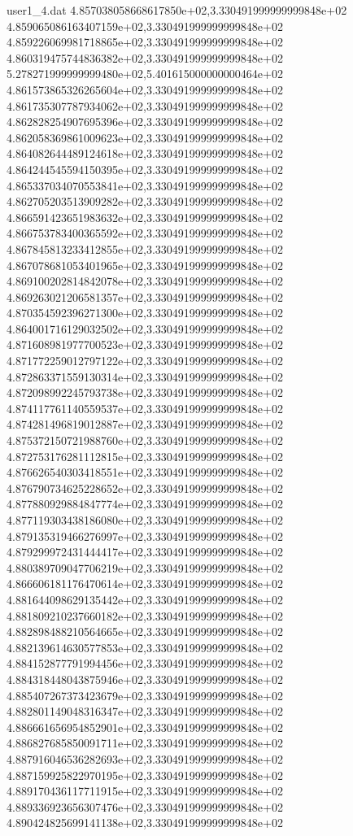 \begin{filecontents}{user1_4.dat}
4.857038058668617850e+02,3.330491999999999848e+02
4.859065086163407159e+02,3.330491999999999848e+02
4.859226069981718865e+02,3.330491999999999848e+02
4.860319475744836382e+02,3.330491999999999848e+02
5.278271999999999480e+02,5.401615000000000464e+02
4.861573865326265604e+02,3.330491999999999848e+02
4.861735307787934062e+02,3.330491999999999848e+02
4.862828254907695396e+02,3.330491999999999848e+02
4.862058369861009623e+02,3.330491999999999848e+02
4.864082644489124618e+02,3.330491999999999848e+02
4.864244545594150395e+02,3.330491999999999848e+02
4.865337034070553841e+02,3.330491999999999848e+02
4.862705203513909282e+02,3.330491999999999848e+02
4.866591423651983632e+02,3.330491999999999848e+02
4.866753783400365592e+02,3.330491999999999848e+02
4.867845813233412855e+02,3.330491999999999848e+02
4.867078681053401965e+02,3.330491999999999848e+02
4.869100202814842078e+02,3.330491999999999848e+02
4.869263021206581357e+02,3.330491999999999848e+02
4.870354592396271300e+02,3.330491999999999848e+02
4.864001716129032502e+02,3.330491999999999848e+02
4.871608981977700523e+02,3.330491999999999848e+02
4.871772259012797122e+02,3.330491999999999848e+02
4.872863371559130314e+02,3.330491999999999848e+02
4.872098992245793738e+02,3.330491999999999848e+02
4.874117761140559537e+02,3.330491999999999848e+02
4.874281496819012887e+02,3.330491999999999848e+02
4.875372150721988760e+02,3.330491999999999848e+02
4.872753176281112815e+02,3.330491999999999848e+02
4.876626540303418551e+02,3.330491999999999848e+02
4.876790734625228652e+02,3.330491999999999848e+02
4.877880929884847774e+02,3.330491999999999848e+02
4.877119303438186080e+02,3.330491999999999848e+02
4.879135319466276997e+02,3.330491999999999848e+02
4.879299972431444417e+02,3.330491999999999848e+02
4.880389709047706219e+02,3.330491999999999848e+02
4.866606181176470614e+02,3.330491999999999848e+02
4.881644098629135442e+02,3.330491999999999848e+02
4.881809210237660182e+02,3.330491999999999848e+02
4.882898488210564665e+02,3.330491999999999848e+02
4.882139614630577853e+02,3.330491999999999848e+02
4.884152877791994456e+02,3.330491999999999848e+02
4.884318448043875946e+02,3.330491999999999848e+02
4.885407267373423679e+02,3.330491999999999848e+02
4.882801149048316347e+02,3.330491999999999848e+02
4.886661656954852901e+02,3.330491999999999848e+02
4.886827685850091711e+02,3.330491999999999848e+02
4.887916046536282693e+02,3.330491999999999848e+02
4.887159925822970195e+02,3.330491999999999848e+02
4.889170436117711915e+02,3.330491999999999848e+02
4.889336923656307476e+02,3.330491999999999848e+02
4.890424825699141138e+02,3.330491999999999848e+02

\end{filecontents}
